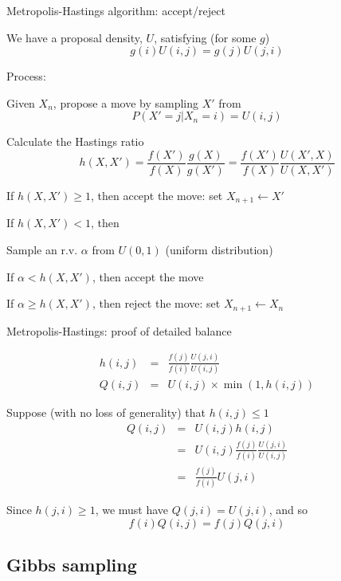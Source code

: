\documentclass{beamer}
\begin{document}
\begin{frame}{Metropolis-Hastings algorithm: accept/reject}

\itemb
\item We have a proposal density, $U$, satisfying (for some $g$)
\[
g(i)U(i,j)=g(j)U(j,i)
\]
\item Process:
 \itemb
 \item Given $X_n$, \alert{propose a move} by sampling $X'$ from
\[
P(X'=j|X_n=i) = U(i,j)
\]
 \item Calculate the \alert{Hastings ratio}
\[
h(X,X') = \frac{f(X')}{f(X)} \frac{g(X)}{g(X')} = \frac{f(X')}{f(X)} \frac{U(X',X)}{U(X,X')}
\]
 \item If $h(X,X') \geq 1$, then \alert{accept the move}: set $X_{n+1} \leftarrow X'$
 \item If $h(X,X') < 1$, then
  \itemb
  \item Sample an r.v. $\alpha$ from $U(0,1)$ (uniform distribution)
  \item If $\alpha < h(X,X')$, then accept the move
  \item If $\alpha \geq h(X,X')$, then \alert{reject the move}: set $X_{n+1} \leftarrow X_n$
  \iteme
 \iteme
\iteme

\end{frame}


\begin{frame}{Metropolis-Hastings: proof of detailed balance}

\begin{eqnarray*}
h(i,j) & = & \frac{f(j)}{f(i)} \frac{U(j,i)}{U(i,j)} \\
Q(i,j) & = & U(i,j) \times \min\left( 1, h(i,j) \right)
\end{eqnarray*}

\itemb
\item Suppose (with no loss of generality) that $h(i,j) \leq 1$
\begin{eqnarray*}
Q(i,j) & = & U(i,j) h(i,j) \\
& = & U(i,j) \frac{f(j)}{f(i)} \frac{U(j,i)}{U(i,j)} \\
& = & \frac{f(j)}{f(i)} U(j,i)
\end{eqnarray*}
\item Since $h(j,i) \geq 1$, we must have $Q(j,i) = U(j,i)$, and so
\[
f(i) Q(i,j) = f(j) Q(j,i)
\]

\iteme

\end{frame}


\subsection{Gibbs sampling}
\end{document}

